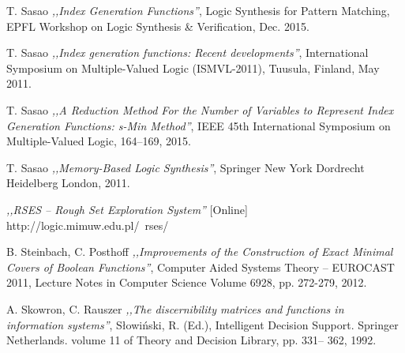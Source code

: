 \begin{thebibliography}{99}
 T. Sasao \emph{,,Index Generation Functions''}, Logic Synthesis for Pattern Matching, EPFL Workshop on Logic Synthesis \& Verification, Dec. 2015.

 T. Sasao \emph{,,Index generation functions: Recent developments''}, International Symposium on Multiple-Valued Logic (ISMVL-2011), Tuusula, Finland, May 2011.

 T. Sasao \emph{,,A Reduction Method For the Number of Variables to Represent Index Generation Functions: s-Min Method''}, IEEE 45th International Symposium on Multiple-Valued Logic, 164–169, 2015.

 T. Sasao \emph{,,Memory-Based Logic Synthesis''}, Springer New York Dordrecht Heidelberg London, 2011.

 \emph{,,RSES – Rough Set Exploration System''} [Online] http://logic.mimuw.edu.pl/~rses/

 B. Steinbach, C. Posthoff \emph{,,Improvements of the Construction of Exact Minimal Covers of Boolean Functions''}, Computer Aided Systems Theory – EUROCAST 2011, Lecture Notes in Computer Science Volume 6928, pp. 272-279, 2012.

 A. Skowron, C. Rauszer \emph{,,The discernibility matrices and functions in information systems''}, Słowiński, R. (Ed.), Intelligent Decision Support. Springer Netherlands. volume 11 of Theory and Decision Library, pp. 331– 362, 1992.


\end{thebibliography}
